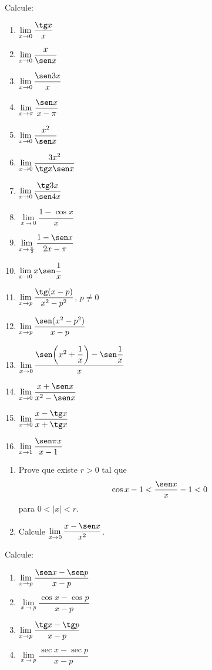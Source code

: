 \begin{exercicio}[1]
Calcule:
\begin{enumerate}[label=\alph*)]
    \item $\lim\limits_{x \to 0} \dfrac{\tg x}{x}$
    \item $\lim\limits_{x \to 0} \dfrac{x}{\sen x}$
    \item $\lim\limits_{x \to 0} \dfrac{\sen 3x}{x}$
    \item $\lim\limits_{x \to \pi} \dfrac{\sen x}{x - \pi}$
    \item $\lim\limits_{x \to 0} \dfrac{x^2}{\sen x}$
    \item $\lim\limits_{x \to 0} \dfrac{3x^2}{\tg x \sen x}$
    \item $\lim\limits_{x \to 0} \dfrac{\tg 3x}{\sen 4x}$
    \item $\lim\limits_{x \to 0} \dfrac{1 - \cos x}{x}$
    \item $\lim\limits_{x \to \frac{\pi}{2}} \dfrac{1 - \sen x}{2x - \pi}$
    \item $\lim\limits_{x \to 0} x \sen\dfrac{1}{x}$
    \item $\lim\limits_{x \to p} \dfrac{\tg(x - p)}{x^2 - p^2}$, $p \neq 0$
    \item $\lim\limits_{x \to p} \dfrac{\sen(x^2 - p^2)}{x - p}$
    \item $\lim\limits_{x \to 0} \dfrac{\sen\!\left(x^2 + \dfrac{1}{x}\right) - \sen\dfrac{1}{x}}{x}$
    \item $\lim\limits_{x \to 0} \dfrac{x + \sen x}{x^2 - \sen x}$
    \item $\lim\limits_{x \to 0} \dfrac{x - \tg x}{x + \tg x}$
    \item $\lim\limits_{x \to 1} \dfrac{\sen\pi x}{x - 1}$
\end{enumerate}
\end{exercicio}

\begin{exercicio}[2]
\begin{enumerate}[label=\alph*)]
    \item Prove que existe $r > 0$ tal que
    \[
    \cos x - 1 < \dfrac{\sen x}{x} - 1 < 0
    \]
    para $0 < |x| < r$.
    \item Calcule $\lim\limits_{x \to 0} \dfrac{x - \sen x}{x^2}$.
\end{enumerate}
\end{exercicio}

\begin{exercicio}[3]
Calcule:
\begin{enumerate}[label=\alph*)]
    \item $\lim\limits_{x \to p} \dfrac{\sen x - \sen p}{x - p}$
    \item $\lim\limits_{x \to p} \dfrac{\cos x - \cos p}{x - p}$
    \item $\lim\limits_{x \to p} \dfrac{\tg x - \tg p}{x - p}$
    \item $\lim\limits_{x \to p} \dfrac{\sec x - \sec p}{x - p}$
\end{enumerate}
\end{exercicio}

